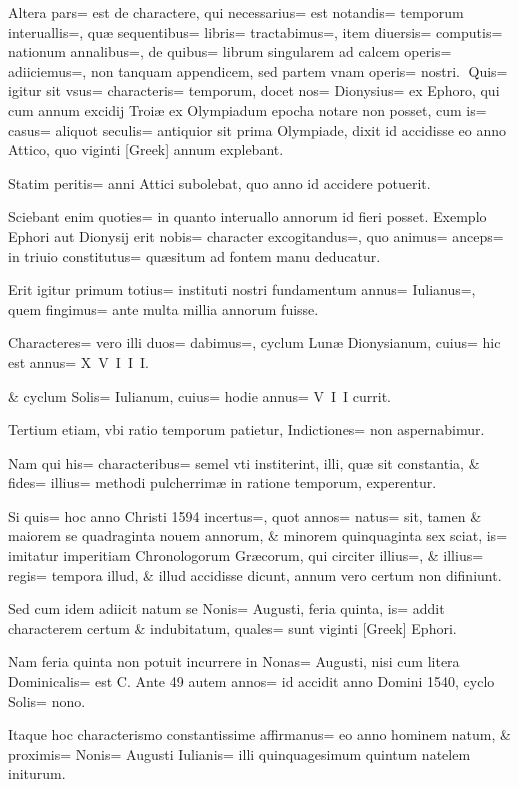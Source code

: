 \begin{parnumbers}

Altera pars= est de charactere, qui necessarius= est notandis= temporum interuallis=, quæ sequentibus= libris= tractabimus=, item diuersis=  computis= nationum annalibus=, de quibus= librum singularem ad calcem operis= adiiciemus=, non tanquam appendicem, sed partem vnam operis= nostri.
Quis= igitur sit vsus= characteris= temporum, docet nos= Dionysius= ex Ephoro, qui cum annum excidij Troiæ ex Olympiadum epocha notare non posset, cum is= casus= aliquot seculis= antiquior sit prima Olympiade, dixit id accidisse eo anno Attico, quo viginti [Greek] annum explebant.

Statim peritis= anni Attici subolebat, quo anno id accidere potuerit.

Sciebant enim quoties= in quanto interuallo annorum id fieri posset. Exemplo Ephori aut Dionysij erit nobis= character excogitandus=, quo animus= anceps= in triuio constitutus= quæsitum ad fontem manu deducatur.

Erit igitur primum  totius= instituti nostri fundamentum annus= Iulianus=, quem fingimus= ante multa millia annorum fuisse.

Characteres= vero illi duos= dabimus=, cyclum Lunæ Dionysianum, cuius= hic est annus= X V I I I.

\& cyclum Solis= Iulianum, cuius= hodie annus= V I I currit.

Tertium etiam, vbi ratio temporum patietur, Indictiones= non aspernabimur.

Nam qui his= characteribus= semel vti institerint, illi, quæ sit constantia, \& fides= illius= methodi pulcherrimæ in ratione temporum, experentur.

Si quis= hoc anno Christi 1594 incertus=, quot annos= natus= sit, tamen \& maiorem se quadraginta nouem annorum, \& minorem quinquaginta sex sciat, is= imitatur imperitiam Chronologorum Græcorum, qui circiter illius=, \& illius= regis= tempora illud, \& illud accidisse dicunt, annum  vero certum non difiniunt.

Sed cum idem adiicit natum se Nonis= Augusti, feria quinta, is= addit characterem certum \& indubitatum, quales= sunt viginti [Greek] Ephori.

Nam feria quinta non potuit incurrere in Nonas= Augusti, nisi cum litera Dominicalis= est C. Ante 49 autem annos= id accidit anno Domini 1540, cyclo Solis= nono.

Itaque hoc characterismo constantissime affirmanus= eo anno hominem natum, \& proximis= Nonis= Augusti Iulianis= illi quinquagesimum quintum natelem initurum.


\end{parnumbers}
